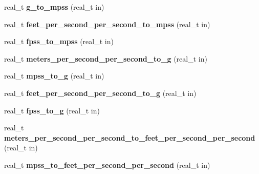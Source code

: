 \begin{DoxyCompactItemize}
\item 
\hypertarget{namespaceetk_a0295af7b089f4283327fa995ed7296a0}{real\-\_\-t {\bfseries g\-\_\-to\-\_\-mpss} (real\-\_\-t in)}\label{namespaceetk_a0295af7b089f4283327fa995ed7296a0}

\item 
\hypertarget{namespaceetk_a7c155b7a95885361674413f2333edf7b}{real\-\_\-t {\bfseries feet\-\_\-per\-\_\-second\-\_\-per\-\_\-second\-\_\-to\-\_\-mpss} (real\-\_\-t in)}\label{namespaceetk_a7c155b7a95885361674413f2333edf7b}

\item 
\hypertarget{namespaceetk_aceab3854560cd801132110e745ee7380}{real\-\_\-t {\bfseries fpss\-\_\-to\-\_\-mpss} (real\-\_\-t in)}\label{namespaceetk_aceab3854560cd801132110e745ee7380}

\item 
\hypertarget{namespaceetk_a25cf2af1e063c70d6824ec936bb17d65}{real\-\_\-t {\bfseries meters\-\_\-per\-\_\-second\-\_\-per\-\_\-second\-\_\-to\-\_\-g} (real\-\_\-t in)}\label{namespaceetk_a25cf2af1e063c70d6824ec936bb17d65}

\item 
\hypertarget{namespaceetk_a58c03c9bb325bc97b75469563aff0918}{real\-\_\-t {\bfseries mpss\-\_\-to\-\_\-g} (real\-\_\-t in)}\label{namespaceetk_a58c03c9bb325bc97b75469563aff0918}

\item 
\hypertarget{namespaceetk_a5bd5a3ee4c360fb31d7ca2b582f1bd19}{real\-\_\-t {\bfseries feet\-\_\-per\-\_\-second\-\_\-per\-\_\-second\-\_\-to\-\_\-g} (real\-\_\-t in)}\label{namespaceetk_a5bd5a3ee4c360fb31d7ca2b582f1bd19}

\item 
\hypertarget{namespaceetk_a5f7f716511b5ae516f07eab3f6869579}{real\-\_\-t {\bfseries fpss\-\_\-to\-\_\-g} (real\-\_\-t in)}\label{namespaceetk_a5f7f716511b5ae516f07eab3f6869579}

\item 
\hypertarget{namespaceetk_ad2a38448884741abaa692c0271e73b4f}{real\-\_\-t {\bfseries meters\-\_\-per\-\_\-second\-\_\-per\-\_\-second\-\_\-to\-\_\-feet\-\_\-per\-\_\-second\-\_\-per\-\_\-second} (real\-\_\-t in)}\label{namespaceetk_ad2a38448884741abaa692c0271e73b4f}

\item 
\hypertarget{namespaceetk_a4415880b845f3b3df8162abe8df57322}{real\-\_\-t {\bfseries mpss\-\_\-to\-\_\-feet\-\_\-per\-\_\-second\-\_\-per\-\_\-second} (real\-\_\-t in)}\label{namespaceetk_a4415880b845f3b3df8162abe8df57322}


\end{DoxyCompactItemize}
